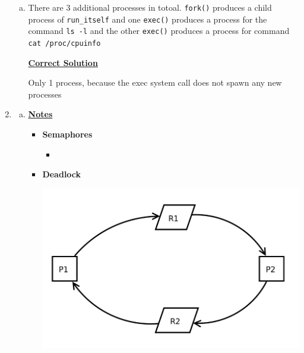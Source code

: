 \documentclass[12pt]{article}
\begin{document}
\begin{enumerate}[1.]
\begin{enumerate}[a)]
        \item

        There are 3 additional processes in totoal. \texttt{fork()} produces a child
        process of \texttt{run\_itself} and one \texttt{exec()} produces a process for the
        command \texttt{ls -l} and the other \texttt{exec()} produces a process for
        command \texttt{cat /proc/cpuinfo}

        \bigskip

        \begin{mdframed}
        \underline{\textbf{Correct Solution}}

        \bigskip

        \color{red}Only 1 process, because the exec system call does not spawn any new processes\color{black}
        \end{mdframed}

    \end{enumerate}

    \item

    \begin{enumerate}[a)]

        \item
        \bigskip

        \underline{\textbf{Notes}}

        \begin{itemize}
            \item \textbf{Semaphores}

            \begin{itemize}
                \item
            \end{itemize}

            \item \textbf{Deadlock}

            \begin{center}
            \includegraphics[width=0.6\linewidth]{images/midterm_2_solution_11.png}
            \end{center}


\end{itemize}
\end{enumerate}
\end{enumerate}
\end{document}
